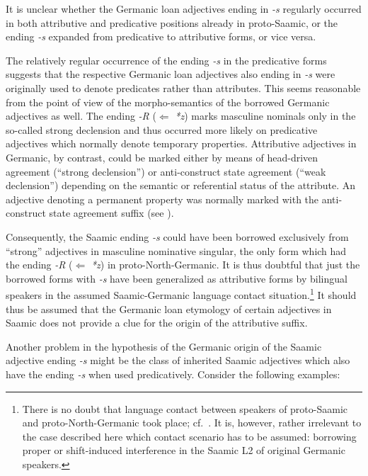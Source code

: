 {\noindent It is unclear whether the Germanic loan adjectives ending in \textit{-s} regularly occurred in both attributive and predicative positions already in proto-Saamic, or the ending \textit{-s} expanded from predicative to attributive forms, or vice versa.

The relatively regular occurrence of the ending \textit{-s} in the predicative forms suggests that the respective Germanic loan adjectives also ending in \textit{-s} were originally used to denote predicates rather than attributes. This seems reasonable from the point of view of the morpho-semantics of the borrowed Germanic adjectives as well. The ending \textit{-R} ($\Leftarrow$ \textit{*z}) marks masculine nominals only in the so-called strong declension and thus occurred more likely on predicative adjectives which normally denote temporary properties. Attributive adjectives in Germanic, by contrast, could be marked either by means of head-driven agreement (“strong declension”) or anti-construct state agreement (“weak declension”) depending on the semantic or referential status of the attribute. An adjective denoting a permanent property was normally marked with the anti-construct state agreement suffix (see ).

Consequently, the Saamic ending \textit{-s} could have been borrowed exclusively from “strong” adjectives in masculine nominative singular, the only form which had the ending \textit{-R} ($\Leftarrow$ \textit{*z}) in proto-North-Germanic. It is thus doubtful that just the borrowed forms with \textit{-s} have been generalized as attributive forms by bilingual speakers in the assumed Saamic-Germanic language contact situation.\footnote{There is no doubt that language contact between speakers of proto-Saamic and proto-North-Germanic took place; cf.~\citealt{kusmenko2008}. It is, however, rather irrelevant to the case described here which contact scenario has to be assumed: borrowing proper or shift-induced interference in the Saamic L2 of original Germanic speakers.} It should thus be assumed that the Germanic loan etymology of certain adjectives in Saamic does not provide a clue for the origin of the attributive suffix. 

Another problem in the hypothesis of the Germanic origin of the Saamic adjective ending \textit{-s} might be the class of inherited Saamic adjectives which also have the ending \textit{-s} when used predicatively. Consider the following examples:

}
